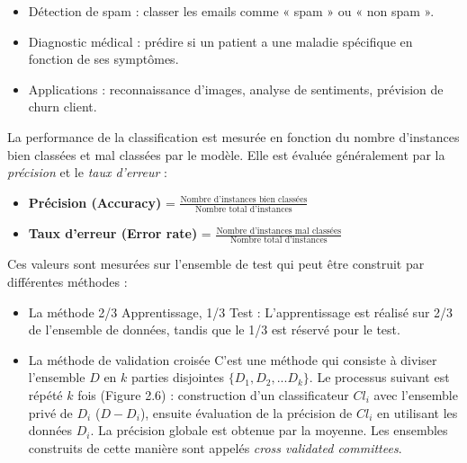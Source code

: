 \documentclass[a4paper,12pt]{article}
\begin{document}

        \begin{itemize}
            \item  Détection de spam : classer les emails comme « spam » ou « non spam ».
            \item  Diagnostic médical : prédire si un patient a une maladie spécifique en fonction de ses symptômes.
            \item  Applications : reconnaissance d’images, analyse de sentiments, prévision de churn client.
        \end{itemize}


        La performance de la classification est mesurée en fonction du nombre d'instances bien classées et mal classées par le modèle. Elle est évaluée généralement par la \textit{précision} et le \textit{taux d'erreur} :
        
        \begin{itemize}
            \item \textbf{Précision (Accuracy)} = $\frac{\text{Nombre d'instances bien classées}}{\text{Nombre total d'instances}}$
            \item \textbf{Taux d'erreur (Error rate)} = $\frac{\text{Nombre d'instances mal classées}}{\text{Nombre total d'instances}}$
        \end{itemize}
        
        Ces valeurs sont mesurées sur l'ensemble de test qui peut être construit par différentes méthodes :

         \begin{itemize}
            \item  {La méthode 2/3 Apprentissage, 1/3 Test} :  L'apprentissage est réalisé sur 2/3 de l'ensemble de données, tandis que le 1/3 est réservé pour le test.
            \item  {La méthode de validation croisée}   C'est une méthode qui consiste à diviser l'ensemble $D$ en $k$ parties disjointes $\{D_1, D_2, ... D_k\}$. Le processus suivant est répété $k$ fois (Figure 2.6) : construction d'un classificateur $Cl_i$ avec l'ensemble privé de $D_i$ ($D - D_i$), ensuite évaluation de la précision de $Cl_i$ en utilisant les données $D_i$. La précision globale est obtenue par la moyenne. Les ensembles construits de cette manière sont appelés \textit{cross validated committees}.
        \end{itemize}
  
\end{document}
